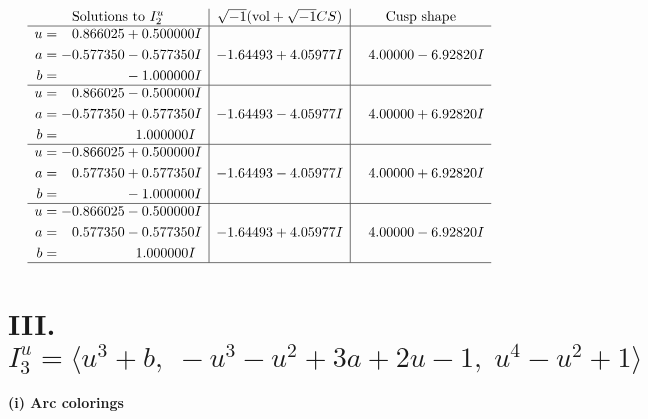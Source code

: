 \documentclass[1p]{elsarticle_modified}
\theoremstyle{definition}
\newcommand{\I}{\sqrt{-1}}
\begin{document}
$$\begin{array}{c|c|c}  
\text{Solutions to }I^u_{2}& \I (\text{vol} + \sqrt{-1}CS) & \text{Cusp shape}\\
 \hline 
\begin{aligned}
u &= \phantom{-}0.866025 + 0.500000 I \\
a &= -0.577350 - 0.577350 I \\
b &= \phantom{-0.000000 } -1.000000 I\end{aligned}
 & -1.64493 + 4.05977 I & \phantom{-}4.00000 - 6.92820 I \\ \hline\begin{aligned}
u &= \phantom{-}0.866025 - 0.500000 I \\
a &= -0.577350 + 0.577350 I \\
b &= \phantom{-0.000000 -}1.000000 I\end{aligned}
 & -1.64493 - 4.05977 I & \phantom{-}4.00000 + 6.92820 I \\ \hline\begin{aligned}
u &= -0.866025 + 0.500000 I \\
a &= \phantom{-}0.577350 + 0.577350 I \\
b &= \phantom{-0.000000 } -1.000000 I\end{aligned}
 & -1.64493 - 4.05977 I & \phantom{-}4.00000 + 6.92820 I \\ \hline\begin{aligned}
u &= -0.866025 - 0.500000 I \\
a &= \phantom{-}0.577350 - 0.577350 I \\
b &= \phantom{-0.000000 -}1.000000 I\end{aligned}
 & -1.64493 + 4.05977 I & \phantom{-}4.00000 - 6.92820 I\\
 \hline 
 \end{array}$$\newpage\newpage\renewcommand{\arraystretch}{1}
\centering \section*{III. $I^u_{3}= \langle u^3+b,\;- u^3- u^2+3 a+2 u-1,\;u^4- u^2+1 \rangle$}
\flushleft \textbf{(i) Arc colorings}\\
\end{document}
